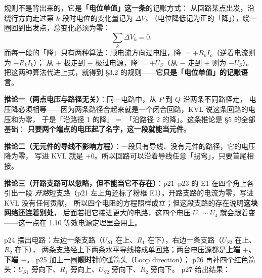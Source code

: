 \documentclass[11pt]{ctexart}
\begin{document}

规则不是背出来的，它是\textbf{「电位单值」这一条}的记账方式：
从回路某点出发，沿绕行方向走过第 $k$ 段时电位的变化量记为 $\Delta V_k$
（电位降低记为正的「降」），绕一圈回到出发点，总变化必须为零：
\[ \sum_k \Delta V_k = 0 . \]
而每一段的「降」只有两种算法：顺电流方向过电阻，降 $=+R_kI_k$（逆着电流则为 $-R_kI_k$）；
从 $+$ 极走到 $-$ 极过电源，降 $=+U_S$（从 $-$ 走到 $+$ 则为 $-U_S$）。
把这两种算法代进上式，就得到 §3.2 的规则——\textbf{它只是「电位单值」的记账语言}。



\textbf{推论一（两点电压与路径无关）}：同一电路中，从 $P$ 到 $Q$ 沿两条不同路径走，
电压降必须相等——因为两条路径合起来就是一个闭合回路，KVL 说这条回路的电压和为零，
于是「沿路径 1 的降」$=$ 「沿路径 2 的降」。这条推论是 §5 的全部基础：
\textbf{只要两个端点的电压起了名字，这一段就能当元件}。

\textbf{推论二（无元件的导线不影响方程）}：一段只有导线、没有元件的路径，它的电压降为零，
写进 KVL 就是 $+0$。所以回路可以沿着导线任意「拐弯」，只要首尾相接。

\textbf{推论三（开路支路可以忽略，但不能当它不存在）}：p21--p23 的 E1 在四个角上各引出一段
\emph{开路}短支路（p21 左上角还标了粉框 E1）。开路支路的电流为零，写进 KVL 没有任何贡献，
所以四个电阻的方程照样成立；但这段支路的存在说明\textbf{这块网络还连着别处}，
后面若把它接进更大的电路，这四个电压 $U_1\sim U_4$ 就会跟着变——这一点在 1.10 等效电源定理里会用上。




p24 摆出电路：左边一条支路（$U_{S1}$ 在上、$R_1$ 在下），右边一条支路（$U_{S2}$ 在上、$R_2$ 在下），
两条支路经上下两条水平导线接成单回路；两台电压源都是\textbf{上端 $+$、下端 $-$}。
p25 加上一圈\textbf{顺时针}的弧箭头（Loop direction）；
p26 再补四个红色箭头：$U_{S1}$ 旁向下、$R_1$ 旁向上、$U_{S2}$ 旁向下、$R_2$ 旁向下。
p27 给出结果：
\end{document}

